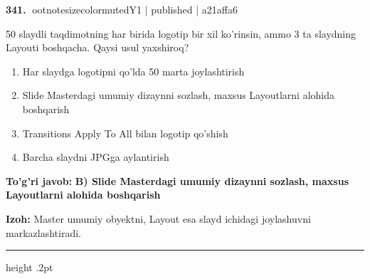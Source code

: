 \documentclass[10pt,a4paper]{article}
\begin{document}
\textbf{\color{ink}341.} {ootnotesizecolor{muted}Y1 | published | a21affa6}
\par
50 slaydli taqdimotning har birida logotip bir xil ko'rinsin, ammo 3 ta slaydning Layouti boshqacha. Qaysi usul yaxshiroq?
\begin{enumerate}[label=\Alph*),leftmargin=9mm]
\item Har slaydga logotipni qo'lda 50 marta joylashtirish
\item Slide Masterdagi umumiy dizaynni sozlash, maxsus Layoutlarni alohida boshqarish
\item Transitions Apply To All bilan logotip qo'shish
\item Barcha slaydni JPGga aylantirish
\end{enumerate}
\begin{tcolorbox}[enhanced,breakable,colback=teal!4,colframe=teal!55!black,boxrule=0.45pt,arc=1.2mm,left=2.8mm,right=2.8mm,top=2mm,bottom=2mm]
\textbf{\color{teal}To'g'ri javob:} \textbf{B) Slide Masterdagi umumiy dizaynni sozlash, maxsus Layoutlarni alohida boshqarish}
\par\smallskip
\textbf{Izoh:} Master umumiy obyektni, Layout esa slayd ichidagi joylashuvni markazlashtiradi.
\end{tcolorbox}
\vspace{2mm}\hrule height .2pt\vspace{2mm}
\end{document}
